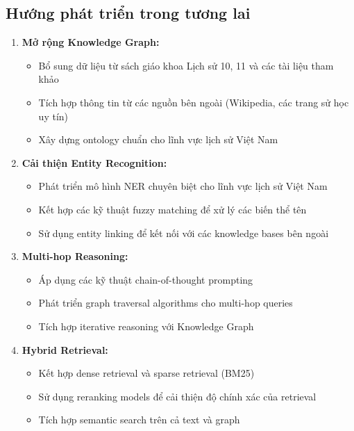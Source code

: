 \subsection{Hướng phát triển trong tương lai}

\begin{enumerate}
    \item \textbf{Mở rộng Knowledge Graph:}
    \begin{itemize}
        \item Bổ sung dữ liệu từ sách giáo khoa Lịch sử 10, 11 và các tài liệu tham khảo
        \item Tích hợp thông tin từ các nguồn bên ngoài (Wikipedia, các trang sử học uy tín)
        \item Xây dựng ontology chuẩn cho lĩnh vực lịch sử Việt Nam
    \end{itemize}
    
    \item \textbf{Cải thiện Entity Recognition:}
    \begin{itemize}
        \item Phát triển mô hình NER chuyên biệt cho lĩnh vực lịch sử Việt Nam
        \item Kết hợp các kỹ thuật fuzzy matching để xử lý các biến thể tên
        \item Sử dụng entity linking để kết nối với các knowledge bases bên ngoài
    \end{itemize}
    
    \item \textbf{Multi-hop Reasoning:}
    \begin{itemize}
        \item Áp dụng các kỹ thuật chain-of-thought prompting
        \item Phát triển graph traversal algorithms cho multi-hop queries
        \item Tích hợp iterative reasoning với Knowledge Graph
    \end{itemize}
    
    \item \textbf{Hybrid Retrieval:}
    \begin{itemize}
        \item Kết hợp dense retrieval và sparse retrieval (BM25)
        \item Sử dụng reranking models để cải thiện độ chính xác của retrieval
        \item Tích hợp semantic search trên cả text và graph
    \end{itemize}
    

\end{enumerate}

